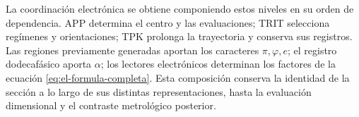 La coordinación electrónica se obtiene componiendo estos niveles en su
orden de dependencia. APP determina el centro y las evaluaciones;
TRIT selecciona regímenes y orientaciones; TPK prolonga la trayectoria
y conserva sus registros. Las regiones previamente generadas aportan
los caracteres \(\pi,\varphi,e\); el registro dodecafásico aporta
\(\alpha\); los lectores electrónicos determinan los factores de
la ecuación \eqref{eq:el-formula-completa}. Esta composición conserva
la identidad de la sección a lo largo de sus distintas
representaciones, hasta la evaluación dimensional y el contraste
metrológico posterior.
